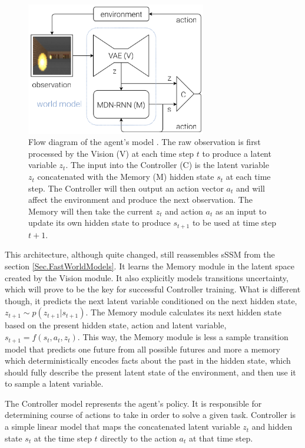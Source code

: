 \begin{figure}[H]
\includegraphics[width=0.7\textwidth,keepaspectratio]{figures/WorldModels.png}
\caption[Flow diagram of the World Models agent's model]{Flow diagram of the agent's model \protect\cite{Algo.WorldModels}. The raw observation is first processed by the Vision (V) at each time step $t$ to produce a latent variable $z_t$. The input into the Controller (C) is the latent variable $z_t$ concatenated with the Memory (M) hidden state $s_t$ at each time step. The Controller will then output an action vector $a_t$ and will affect the environment and produce the next observation. The Memory will then take the current $z_t$ and action $a_t$ as an input to update its own hidden state to produce $s_{t+1}$ to be used at time step $t + 1$.}
\label{Fig.WorldModels}
\end{figure}

This architecture, although quite changed, still reassembles sSSM from the section \ref{Sec.FastWorldModels}. It learns the Memory module in the latent space created by the Vision module. It also explicitly models transitions uncertainty, which will prove to be the key for successful Controller training. What is different though, it predicts the next latent variable conditioned on the next hidden state, $z_{t+1} \sim p(z_{t+1}|s_{t+1})$. The Memory module calculates its next hidden state based on the present hidden state, action and latent variable, $s_{t+1} = f(s_t, a_t, z_t)$. This way, the Memory module is less a sample transition model that predicts one future from all possible futures and more a memory which deterministically encodes facts about the past in the hidden state, which should fully describe the present latent state of the environment, and then use it to sample a latent variable.

The Controller model represents the agent's policy. It is responsible for determining course of actions to take in order to solve a given task. Controller is a simple linear model that maps the concatenated latent variable $z_t$ and hidden state $s_t$ at the time step $t$ directly to the action $a_t$ at that time step.

